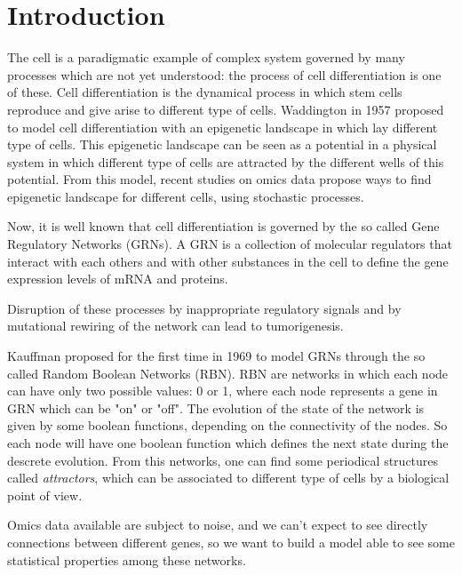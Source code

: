 \chapter*{Introduction}                 %

The cell is a paradigmatic example of complex system governed by many processes which are not yet understood: the process of cell differentiation is one of these. 
Cell differentiation is the dynamical process in which stem cells reproduce and give arise to different type of cells.
Waddington in 1957 \cite{K13} proposed to model cell differentiation with an epigenetic landscape in which lay different type of cells. 
This epigenetic landscape can be seen as a potential in a physical system in which different type of cells are attracted by the different wells of this potential.
From this model, recent studies on omics data propose ways to find epigenetic landscape for different cells\cite{K10}\cite{K11}\cite{K12}, using stochastic processes.

Now, it is well known that cell differentiation is governed by the so called Gene Regulatory Networks (GRNs).
A GRN is a collection of molecular regulators that interact with each others and with other substances in the cell to define the gene expression levels of mRNA and proteins. 

Disruption of these processes by inappropriate regulatory signals and by mutational rewiring of the
network can lead to tumorigenesis\cite{K4}. 

Kauffman proposed for the first time in 1969\cite{K1} to model GRNs through the so called Random Boolean Networks (RBN).
RBN are networks in which each node can have only two possible values: 0 or 1, where each node represents a gene in GRN which can be "on" or "off"\cite{K5}.
The evolution of the state of the network is given by some boolean functions, depending on the connectivity of the nodes. So each node will have one boolean function which defines the next state during the descrete evolution.
From this networks, one can find some periodical structures called \emph{attractors}, which can be associated to different type of cells by a biological point of view\cite{K2}\cite{K3}\cite{K9}.

Omics data available are subject to noise, and we can’t expect to see directly connections between different genes, so we want to build a model able to see some statistical properties among these networks.

